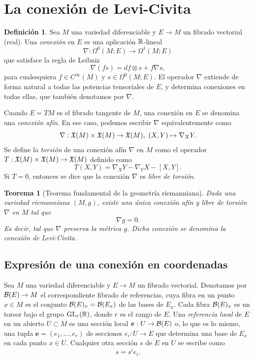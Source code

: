 \documentclass[11pt,a4paper]{amsbook}
\newtheorem{thm}[subsection]{Teorema}
\theoremstyle{remark} \newtheorem{rmk}[subsection]{Observación}
\theoremstyle{definition} \newtheorem{defn}[subsection]{Definición}
\theoremstyle{definition} \newtheorem{ex}[subsection]{Ejemplo}
\theoremstyle{definition} \newtheorem{ej}[subsection]{Ejercicio}
\begin{document}
\section{La conexión de Levi-Civita}
\begin{defn}
Sea $M$ una variedad diferenciable y $E\rightarrow M$ un fibrado vectorial (real). Una \emph{conexión} en $E$ es una aplicación $\mathbb R$-lineal
\begin{equation*}
\nabla: \Omega^0(M;E) \rightarrow \Omega^1(M;E)
\end{equation*}
que satisface la regla de Leibniz
\begin{equation*}
\nabla(fs) = df \otimes s + f \nabla s,
\end{equation*}
para cualesquiera $f \in C^\infty(M)$ y $s\in \Omega^0(M;E)$. El operador $\nabla$ extiende de forma natural a todas las potencias tensoriales de $E$, y determina conexiones en todas ellas, que también denotamos por $\nabla$.

Cuando $E=TM$ es el fibrado tangente de $M$, una conexión en $E$ se denomina una \emph{conexión afín}. En ese caso, podemos escribir $\nabla$ equivalentemente como
\begin{equation*}
\nabla: \mathfrak X(M) \times \mathfrak X(M) \rightarrow \mathfrak X(M),\ (X,Y) \mapsto \nabla_XY.
\end{equation*}
  Se define la \emph{torsión} de una conexión afín $\nabla$ en $M$ como el operador $T:\mathfrak X(M)\times \mathfrak X(M)\rightarrow \mathfrak X(M)$ definido como
  \begin{equation*}
T(X,Y) = \nabla_X Y - \nabla_Y X - [X,Y].
  \end{equation*}
  Si $T=0$, entonces se dice que la conexión $\nabla$ es \emph{libre de torsión}.
\end{defn}

\begin{thm}[Teorema fundamental de la geometría riemanniana]
Dada una variedad riemanniana $(M,g)$, existe una única conexión afín y libre de torsión $\nabla$ en $M$ tal que
\begin{equation*}
\nabla g = 0.
\end{equation*}
Es decir, tal que $\nabla$ preserva la métrica $g$. Dicha conexión se denomina la \emph{conexión de Levi-Civita}.
\end{thm}
\subsection{Expresión de una conexión en coordenadas} Sea $M$ una variedad diferenciable y $E\rightarrow M$ un fibrado vectorial. Denotamos por $\mathcal B(E)\rightarrow M$ el correspondiente fibrado de referencias, cuya fibra en un punto $x\in M$ es el conjunto $\mathcal B(E)_x=\mathcal B(E_x)$ de las bases de $E_x$. Cada fibra $\mathcal B(E)_x$ es un torsor bajo el grupo $\operatorname{GL}_r(\mathbb R)$, donde $r$ es el rango de $E$. Una \emph{referencia local} de $E$ en un abierto $U\subset M$ es una sección local $\bm{e}: U \rightarrow \mathcal B(E)$ o, lo que es lo mismo, una tupla $\bm{e}=(e_1,\dots,e_r)$ de secciones $e_i:U\rightarrow E$ que determina una base de $E_x$ en cada punto $x\in U$. Cualquier otra sección $s$ de $E$ en $U$ se escribe como
\begin{equation*}
s = s^i e_i.
\end{equation*}
\end{document}
